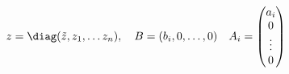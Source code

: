 \begin{equation}
z= \diag(\tilde z, z_1 ,\dots z_n),\quad B= (b_i,0,\dots,0)\quad
A_i=\begin{pmatrix}a_i\\ 0\\\vdots\\0\end{pmatrix}
\end{equation}

